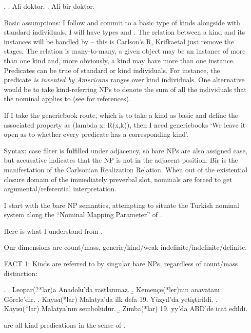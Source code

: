 \documentclass[11pt,a4paper]{article}
\begin{document}
\ex.\label{ex:doktor} 
\a. Ali doktor.
\b. Ali bir doktor.

Basic assumptions: I follow \cite[p.\ 64]{krifkaetal95} and commit to a basic type of kinds alongside with standard individuals, I will have types  and . The relation between a kind and its instances will be handled by  -- this is Carlson's R, Krifkaetal just remove the stages. The relation is many-to-many, a given object may be an instance of more than one kind and, more obviously, a kind may have more than one instance. Predicates can be true of standard or kind individuals. For instance, the predicate \textit{is invented by Americans} ranges over kind individuals. One alternative would be to take kind-referring NPs to denote the sum of all the individuals that the nominal applies to (see \cite{krifkaetal95} for references).

If I take the genericbook route, which is to take a kind as basic and define the associated property as (lambda x: R(x,k)), then I need genericbooks `We leave it open as to whether every predicate has a corresponding kind'.

Syntax: case filter is fulfilled under adjacency, so bare NPs are also assigned case, but accusative indicates that the NP is not in the adjacent position. Bir is the manifestation of the Carlsonian Realization Relation. When out of the existential closure domain of the immediately preverbal slot, nominals are forced to get argumental/referential interpretation.

\begin{comment}
Krifkaetal
* p87 incorporation and kind-reference.
\end{comment}

I start with the bare NP semantics, attempting to situate the Turkish nominal system along the ``Nominal Mapping Parameter''  of  .

Here is what I understand from . 

Our dimensions are count/mass, generic/kind/weak indefinite/indefinite/definite.

FACT 1: Kinds are referred to by singular bare NPs, regardless of count/mass distinction:

\ex.
\a. Leopar(?*lar)a Anadolu'da rastlanmaz.
\b. Kemençe(*ler)nin anavatanı Görele'dir.
\b. Kayısı(*lar) Malatya'da ilk defa 19. Yüzyıl'da yetiştirildi. 
\b. Kayısı(*lar) Malatya'nın sembolüdür.
\b. Zımba(*lar) 19. yy'da ABD'de icat edildi.

are all kind predications in the sense of .
\end{document}
